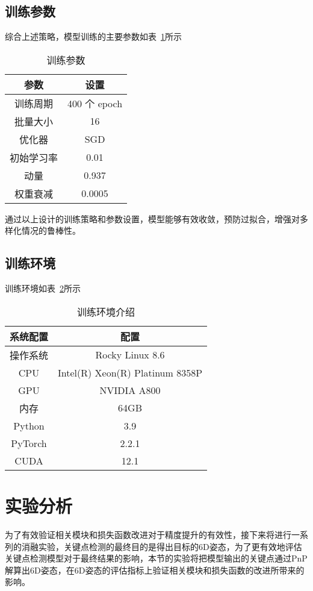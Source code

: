 \subsection{训练参数}
综合上述策略，模型训练的主要参数如表~\ref{tab:train_param}所示
\begin{table}[htbp]
	\centering
	\caption{训练参数}
	\label{tab:train_param}
	{%
		\renewcommand{\arraystretch}{1.2}%
		\begin{tabular}{cc}  %
			\toprule[1.5pt]
			参数        & 设置 \\
			\midrule[1pt]
			训练周期    & 400 个 epoch \\
			批量大小    & 16 \\
			优化器      & SGD \\
			初始学习率  & 0.01 \\
			动量        & 0.937 \\
			权重衰减    & 0.0005 \\
			\bottomrule[1.5pt]
		\end{tabular}
	}
\end{table}

通过以上设计的训练策略和参数设置，模型能够有效收敛，预防过拟合，增强对多样化情况的鲁棒性。
\subsection{训练环境}
训练环境如表~\ref{tab:training_env}所示
\begin{table}[htbp]
	\centering
	\caption{训练环境介绍}
	\label{tab:training_env}
	{%
		\renewcommand{\arraystretch}{1.2}%
		\begin{tabular}{cc}  %
			\toprule[1.5pt]
			系统配置   & 配置 \\
			\midrule[1pt]
			操作系统   & Rocky Linux 8.6 \\
			CPU        & Intel(R) Xeon(R) Platinum 8358P \\
			GPU        & NVIDIA A800 \\
			内存       & 64GB \\
			Python     & 3.9 \\
			PyTorch    & 2.2.1 \\
			CUDA       & 12.1 \\
			\bottomrule[1.5pt]
		\end{tabular}
	}
\end{table}
\section{实验分析}
为了有效验证相关模块和损失函数改进对于精度提升的有效性，接下来将进行一系列的消融实验，关键点检测的最终目的是得出目标的6D姿态，为了更有效地评估关键点检测模型对于最终结果的影响，本节的实验将把模型输出的关键点通过PnP解算出6D姿态，在6D姿态的评估指标上验证相关模块和损失函数的改进所带来的影响。
